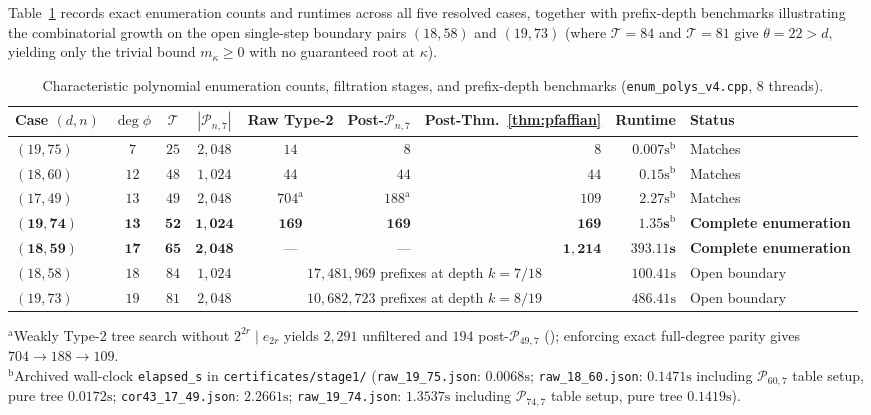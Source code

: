 \documentclass[11pt,reqno]{amsart}
\theoremstyle{definition}
\theoremstyle{remark}
\numberwithin{equation}{section}
\numberwithin{table}{section}
\begin{document}
Table~\ref{tab:stage1_runtimes} records exact enumeration counts and runtimes across all five resolved cases, together with prefix-depth benchmarks illustrating the combinatorial growth on the open single-step boundary pairs $(18, 58)$ and $(19, 73)$ (where $\mathcal{T} = 84$ and $\mathcal{T} = 81$ give $\theta = 22 > d$, yielding only the trivial bound $m_\kappa \ge 0$ with no guaranteed root at $\kappa$).

\begin{table}[htbp]
\centering
\caption{Characteristic polynomial enumeration counts, filtration stages, and prefix-depth benchmarks (\nolinkurl{enum_polys_v4.cpp}, 8 threads).}\label{tab:stage1_runtimes}
\scriptsize
\setlength{\tabcolsep}{4pt}
\begin{tabular}{@{}lccccrrrl@{}}
\toprule
Case $(d,n)$ & $\deg\phi$ & $\mathcal{T}$ & $|\mathcal{P}_{n,7}|$ & Raw Type-2 & Post-$\mathcal{P}_{n,7}$ & Post-Thm.~\ref{thm:pfaffian} & Runtime & Status \\
\midrule
$(19, 75)$ & $7$ & $25$ & $2{,}048$ & $14$ & $8$ & $8$ & $0.007\text{s}^{\text{b}}$ & Matches~\cite{GSY2021} \\
$(18, 60)$ & $12$ & $48$ & $1{,}024$ & $44$ & $44$ & $44$ & $0.15\text{s}^{\text{b}}$ & Matches~\cite{GS2024} \\
$(17, 49)$ & $13$ & $49$ & $2{,}048$ & $704^{\text{a}}$ & $188^{\text{a}}$ & $109$ & $2.27\text{s}^{\text{b}}$ & Matches~\cite{GSY2023} \\
$\mathbf{(19, 74)}$ & $\mathbf{13}$ & $\mathbf{52}$ & $\mathbf{1{,}024}$ & $\mathbf{169}$ & $\mathbf{169}$ & $\mathbf{169}$ & $\mathbf{1.35\text{s}}^{\text{b}}$ & \textbf{Complete enumeration} \\
$\mathbf{(18, 59)}$ & $\mathbf{17}$ & $\mathbf{65}$ & $\mathbf{2{,}048}$ & --- & --- & $\mathbf{1{,}214}$ & $\mathbf{393.11\text{s}}$ & \textbf{Complete enumeration} \\
\midrule
$(18, 58)$ & $18$ & $84$ & $1{,}024$ & \multicolumn{3}{c}{$17{,}481{,}969$ prefixes at depth $k = 7 / 18$} & $100.41\text{s}$ & Open boundary \\
$(19, 73)$ & $19$ & $81$ & $2{,}048$ & \multicolumn{3}{c}{$10{,}682{,}723$ prefixes at depth $k = 8 / 19$} & $486.41\text{s}$ & Open boundary \\
\bottomrule
\end{tabular}
\par\vspace{3pt}
\raggedright\scriptsize
$^{\text{a}}$Weakly Type-2 tree search without $2^{2r}\mid e_{2r}$ yields $2{,}291$ unfiltered and $194$ post-$\mathcal{P}_{49,7}$ (\cite[Lem.~3.6]{GSY2023}); enforcing exact full-degree parity gives $704 \to 188 \to 109$.\\
$^{\text{b}}$Archived wall-clock \texttt{elapsed\_s} in \nolinkurl{certificates/stage1/} (\nolinkurl{raw_19_75.json}: $0.0068\text{s}$; \nolinkurl{raw_18_60.json}: $0.1471\text{s}$ including $\mathcal{P}_{60,7}$ table setup, pure tree $0.0172\text{s}$; \nolinkurl{cor43_17_49.json}: $2.2661\text{s}$; \nolinkurl{raw_19_74.json}: $1.3537\text{s}$ including $\mathcal{P}_{74,7}$ table setup, pure tree $0.1419\text{s}$).
\end{table}
\end{document}
